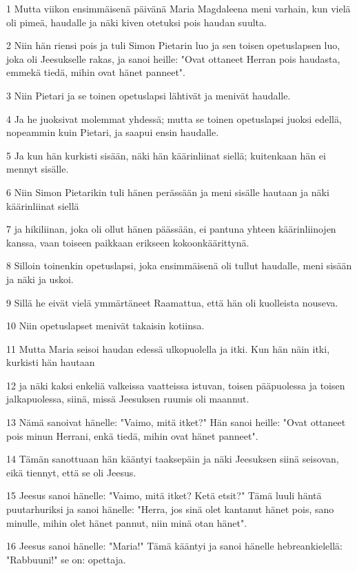 \par 1 Mutta viikon ensimmäisenä päivänä Maria Magdaleena meni varhain, kun vielä oli pimeä, haudalle ja näki kiven otetuksi pois haudan suulta.
\par 2 Niin hän riensi pois ja tuli Simon Pietarin luo ja sen toisen opetuslapsen luo, joka oli Jeesukselle rakas, ja sanoi heille: "Ovat ottaneet Herran pois haudasta, emmekä tiedä, mihin ovat hänet panneet".
\par 3 Niin Pietari ja se toinen opetuslapsi lähtivät ja menivät haudalle.
\par 4 Ja he juoksivat molemmat yhdessä; mutta se toinen opetuslapsi juoksi edellä, nopeammin kuin Pietari, ja saapui ensin haudalle.
\par 5 Ja kun hän kurkisti sisään, näki hän käärinliinat siellä; kuitenkaan hän ei mennyt sisälle.
\par 6 Niin Simon Pietarikin tuli hänen perässään ja meni sisälle hautaan ja näki käärinliinat siellä
\par 7 ja hikiliinan, joka oli ollut hänen päässään, ei pantuna yhteen käärinliinojen kanssa, vaan toiseen paikkaan erikseen kokoonkäärittynä.
\par 8 Silloin toinenkin opetuslapsi, joka ensimmäisenä oli tullut haudalle, meni sisään ja näki ja uskoi.
\par 9 Sillä he eivät vielä ymmärtäneet Raamattua, että hän oli kuolleista nouseva.
\par 10 Niin opetuslapset menivät takaisin kotiinsa.
\par 11 Mutta Maria seisoi haudan edessä ulkopuolella ja itki. Kun hän näin itki, kurkisti hän hautaan
\par 12 ja näki kaksi enkeliä valkeissa vaatteissa istuvan, toisen pääpuolessa ja toisen jalkapuolessa, siinä, missä Jeesuksen ruumis oli maannut.
\par 13 Nämä sanoivat hänelle: "Vaimo, mitä itket?" Hän sanoi heille: "Ovat ottaneet pois minun Herrani, enkä tiedä, mihin ovat hänet panneet".
\par 14 Tämän sanottuaan hän kääntyi taaksepäin ja näki Jeesuksen siinä seisovan, eikä tiennyt, että se oli Jeesus.
\par 15 Jeesus sanoi hänelle: "Vaimo, mitä itket? Ketä etsit?" Tämä luuli häntä puutarhuriksi ja sanoi hänelle: "Herra, jos sinä olet kantanut hänet pois, sano minulle, mihin olet hänet pannut, niin minä otan hänet".
\par 16 Jeesus sanoi hänelle: "Maria!" Tämä kääntyi ja sanoi hänelle hebreankielellä: "Rabbuuni!" se on: opettaja.
